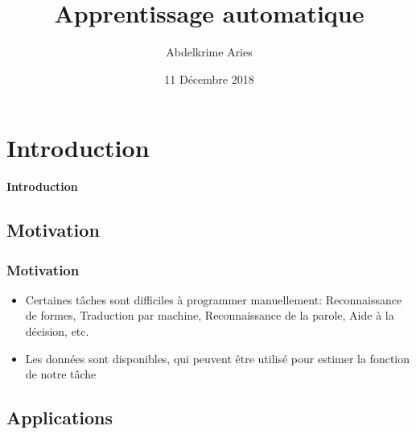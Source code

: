\documentclass[]{beamer} %
\title[Apprentissage automatique] %
{Apprentissage automatique}
\institute{}
\author[A. Aries]{\footnotesize Abdelkrime Aries}
\date{11 Décembre 2018}
\begin{document}
\begin{frame}
\maketitle
\end{frame}


\section{Introduction}

\begin{frame}

\begin{center}
	\Huge\bfseries Introduction
\end{center}

\end{frame}


\subsection{Motivation}

\begin{frame}
\frametitle{Motivation}

\begin{itemize}
	\item Certaines tâches sont difficiles à programmer manuellement: Reconnaissance de formes, Traduction par machine, Reconnaissance de la parole, Aide à la décision, etc.
	\item Les données sont disponibles, qui peuvent être utilisé pour estimer la fonction de notre tâche 
\end{itemize}

\end{frame}


\subsection{Applications}
\end{document}

